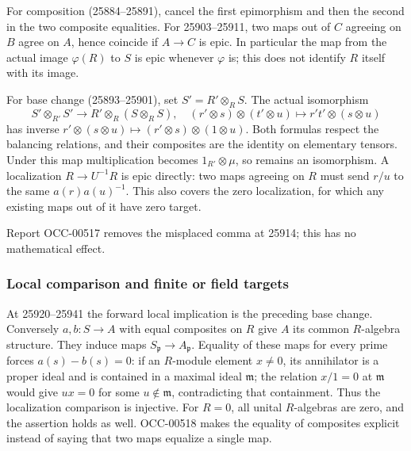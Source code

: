 For composition (25884--25891), cancel the first epimorphism and then the second in the two composite equalities. For 25903--25911, two maps out of \(C\) agreeing on \(B\) agree on \(A\), hence coincide if \(A\to C\) is epic. In particular the map from the actual image \(\varphi(R)\) to \(S\) is epic whenever \(\varphi\) is; this does not identify \(R\) itself with its image.

For base change (25893--25901), set \(S'=R'\otimes_RS\). The actual isomorphism \[
S'\otimes_{R'}S'\longrightarrow R'\otimes_R(S\otimes_RS),
\quad (r'\otimes s)\otimes(t'\otimes u)\longmapsto r't'\otimes(s\otimes u)
\] has inverse \(r'\otimes(s\otimes u)\mapsto(r'\otimes s)\otimes(1\otimes u)\). Both formulas respect the balancing relations, and their composites are the identity on elementary tensors. Under this map multiplication becomes \(1_{R'}\otimes\mu\), so remains an isomorphism. A localization \(R\to U^{-1}R\) is epic directly: two maps agreeing on \(R\) must send \(r/u\) to the same \(a(r)a(u)^{-1}\). This also covers the zero localization, for which any existing maps out of it have zero target.

Report OCC-00517 removes the misplaced comma at 25914; this has no mathematical effect.

\subsubsection{Local comparison and finite or field targets}\label{algebra-proof-021-local-comparison-and-finite-or-field-targets}

At 25920--25941 the forward local implication is the preceding base change. Conversely \(a,b:S\to A\) with equal composites on \(R\) give \(A\) its common \(R\)-algebra structure. They induce maps \(S_{\mathfrak p}\to A_{\mathfrak p}\). Equality of these maps for every prime forces \(a(s)-b(s)=0\): if an \(R\)-module element \(x\ne0\), its annihilator is a proper ideal and is contained in a maximal ideal \(\mathfrak m\); the relation \(x/1=0\) at \(\mathfrak m\) would give \(u x=0\) for some \(u\notin\mathfrak m\), contradicting that containment. Thus the localization comparison is injective. For \(R=0\), all unital \(R\)-algebras are zero, and the assertion holds as well. OCC-00518 makes the equality of composites explicit instead of saying that two maps equalize a single map.

